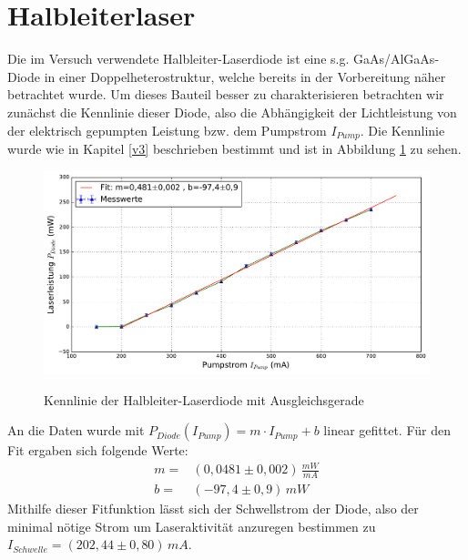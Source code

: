 \documentclass[twoside,colorback,accentcolor=tud4c,11pt]{tudreport}
\begin{document}
\section{Halbleiterlaser}
Die im Versuch verwendete Halbleiter-Laserdiode ist eine s.g. GaAs/AlGaAs-Diode in einer Doppelheterostruktur, welche bereits in der Vorbereitung näher betrachtet wurde. Um dieses Bauteil besser zu charakterisieren betrachten wir zunächst die Kennlinie dieser Diode, also die Abhängigkeit der Lichtleistung von der elektrisch gepumpten Leistung bzw. dem Pumpstrom $I_{Pump}$. Die Kennlinie wurde wie in Kapitel \ref{v3} beschrieben bestimmt und ist in Abbildung \ref{kd} zu sehen.
\begin{figure}[H]
\centering
   	\begin{minipage}[b]{0.85\textwidth}
   	\includegraphics[width=\textwidth]{graphics/kennlinie_diode.pdf}
  	\label{kd}
   	\end{minipage}
\caption{Kennlinie der Halbleiter-Laserdiode mit Ausgleichsgerade}	
\end{figure}
An die Daten wurde mit $P_{Diode}(I_{Pump})=m\cdot I_{Pump} +b $ linear gefittet. Für den Fit ergaben sich folgende Werte:
\begin{align}
m=& (0,0481 \pm 0,002)\,\si{\frac{mW}{mA}}\\
b=& (-97,4 \pm 0,9)\,\si{mW}
\end{align}
Mithilfe dieser Fitfunktion lässt sich der Schwellstrom der Diode, also der minimal nötige Strom um Laseraktivität anzuregen bestimmen zu $I_{Schwelle}=(202,44\pm 0,80)\,\si{mA}$.\\
\end{document}
